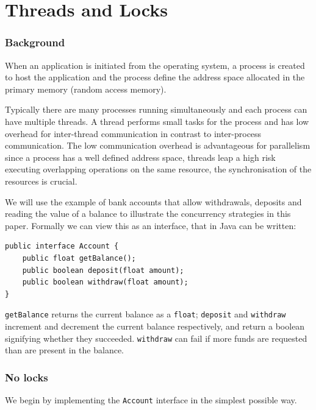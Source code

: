 \documentclass[a4paper,12pt]{kth-mag}
\begin{document}
\part{Threads and Locks}

\section{Background}
When an application is initiated from the operating system, a process is created to host the application and the process define the address space allocated in the primary memory (random access memory). 

Typically there are many processes running simultaneously and each process can have multiple threads. A thread performs small tasks for the process and has low overhead for inter-thread communication in contrast to inter-process communication. The low communication overhead is advantageous for parallelism since a process has a well defined address space, threads leap a high risk executing overlapping operations on the same resource, the synchronisation of the resources is crucial.

We will use the example of bank accounts that allow withdrawals, deposits and reading the value of a balance to illustrate the concurrency strategies in this paper. Formally we can view this as an interface, that in Java can be written:

\begin{listing}[H]
	\begin{verbatim}
public interface Account {
    public float getBalance();
    public boolean deposit(float amount);
    public boolean withdraw(float amount);
}
  	\end{verbatim}
\end{listing}

\texttt{getBalance} returns the current balance as a \texttt{float}; \texttt{deposit} and \texttt{withdraw} increment and decrement the current balance respectively, and return a boolean signifying whether they succeeded. \texttt{withdraw} can fail if more funds are requested than are present in the balance.

\newpage

\section{No locks}

We begin by implementing the \texttt{Account} interface in the simplest possible way.
\end{document}
